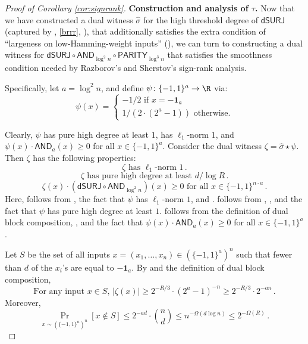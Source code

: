 \documentclass{toc}
\newcommand{\dumSURJ}{\mathsf{dSURJ}}
\newcommand{\bits}{\{-1,1\}}
\newcommand{\ls}{\star}
\newcommand{\AND}{\mathsf{AND}}
\newcommand{\PARITY}{\mathsf{PARITY}}
\begin{document}
\begin{proof}[Proof of Corollary \ref{cor:signrank}]
\medskip \noindent \textbf{Construction and analysis of $\tau$.}
Now that we have constructed a dual witness $\hat{\sigma}$ for the high threshold degree of $\dumSURJ$ 
(captured by , \eqref{brrr}, ), that additionally %
%
satisfies  %
the extra condition
of ``largeness on low-Hamming-weight inputs'' (),
we can turn to constructing a dual witness for $\dumSURJ \circ \AND_{\log^2 n} \circ \PARITY_{\log^3 n}$
that satisfies the smoothness condition needed by Razborov's and Sherstov's sign-rank analysis.

Specifically, let $a=\log^2 n$, and define $\psi \colon \bits^{a} \to \R$ via:
$$\psi(x) = \begin{cases} -1/2 \text{ if } x=\mathbf{-1}_{a}\\
1/(2 \cdot (2^a-1)) \text{ otherwise}. \end{cases}$$

Clearly, $\psi$ has pure high degree at least $1$, has $\ell_1$-norm $1$, and $\psi(x) \cdot \AND_a(x) \geq 0$
for all $x \in \bits^a$.
Consider the dual witness $\zeta = \hat{\sigma} \ls \psi$. 
Then $\zeta$ has the following properties:
\begin{equation} \label{umissed1bro}
\zeta \text{ has } \ell_1\text{-norm } 1\,.
\end{equation}
\begin{equation} \label{thismuststopbrah}
\zeta \text{ has pure high degree at least } d/\log R\,.
\end{equation}
\begin{equation} \label{asdfasdf}
\zeta(x) \cdot \left(\dumSURJ \circ \AND_{\log^2 n}\right)(x) \geq 0 \text{ for all } x \in \bits^{n \cdot a}\,. %
\end{equation}
Here,  follows from , the fact that $\psi$ has $\ell_1$-norm $1$, and .  follows from , ,
and the fact that $\psi$ has pure high degree at least $1$.
 follows from the definition of dual block composition, ,
and the fact that $\psi(x) \cdot \AND_a(x) \geq 0$
for all $x \in \bits^a$.

Let $S$ be the set of all inputs $x=(x_1, \dots, x_n) \in \left(\bits^a\right)^{n}$ such that 
fewer than $d$ 
of the $x_i$'s are equal to $-\mathbf{1}_a$.
By  and the definition of dual block composition,
\begin{equation} \label{eq:tautautau}
\text{For any input } x\in S\text{, } |\zeta(x)| \geq 2^{-R/3} \cdot (2^{a}-1)^{-n} \geq 2^{-R/3}  \cdot 2^{-an}\,.\end{equation}
Moreover, 
\begin{equation}
\label{eq:tautautau2} \Pr_{x \sim \left(\bits^a\right)^n}[x \not \in S] 
\leq 2^{-a d} \cdot {n \choose d} \leq n^{-\Omega(d \log n)} \leq 2^{-\Omega(R)}\,. \end{equation}


\end{proof}
\end{document}
